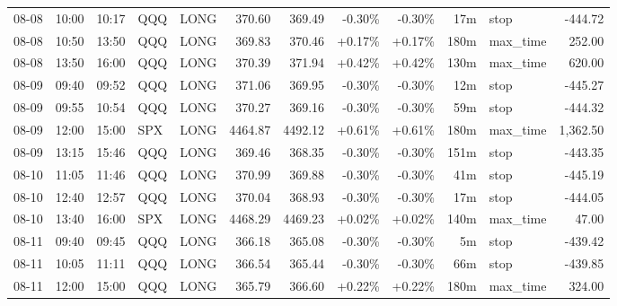 \documentclass[11pt,a4paper]{article}
\begin{document}
\begin{center}
\begin{longtable}{>{\color{txtmain}}l l l l l r r r r r >{\color{txtmain}}l r}
08-08 & 10:00 & 10:17 & QQQ & LONG & 370.60 & 369.49 & \textcolor{lossred}{-0.30\%} & \textcolor{lossred}{-0.30\%} & 17m & stop & \textcolor{lossred}{-444.72} \\
08-08 & 10:50 & 13:50 & QQQ & LONG & 369.83 & 370.46 & \textcolor{wingreen}{+0.17\%} & \textcolor{wingreen}{+0.17\%} & 180m & max\_time & \textcolor{wingreen}{252.00} \\
08-08 & 13:50 & 16:00 & QQQ & LONG & 370.39 & 371.94 & \textcolor{wingreen}{+0.42\%} & \textcolor{wingreen}{+0.42\%} & 130m & max\_time & \textcolor{wingreen}{620.00} \\
08-09 & 09:40 & 09:52 & QQQ & LONG & 371.06 & 369.95 & \textcolor{lossred}{-0.30\%} & \textcolor{lossred}{-0.30\%} & 12m & stop & \textcolor{lossred}{-445.27} \\
08-09 & 09:55 & 10:54 & QQQ & LONG & 370.27 & 369.16 & \textcolor{lossred}{-0.30\%} & \textcolor{lossred}{-0.30\%} & 59m & stop & \textcolor{lossred}{-444.32} \\
08-09 & 12:00 & 15:00 & SPX & LONG & 4464.87 & 4492.12 & \textcolor{wingreen}{+0.61\%} & \textcolor{wingreen}{+0.61\%} & 180m & max\_time & \textcolor{wingreen}{1,362.50} \\
08-09 & 13:15 & 15:46 & QQQ & LONG & 369.46 & 368.35 & \textcolor{lossred}{-0.30\%} & \textcolor{lossred}{-0.30\%} & 151m & stop & \textcolor{lossred}{-443.35} \\
08-10 & 11:05 & 11:46 & QQQ & LONG & 370.99 & 369.88 & \textcolor{lossred}{-0.30\%} & \textcolor{lossred}{-0.30\%} & 41m & stop & \textcolor{lossred}{-445.19} \\
08-10 & 12:40 & 12:57 & QQQ & LONG & 370.04 & 368.93 & \textcolor{lossred}{-0.30\%} & \textcolor{lossred}{-0.30\%} & 17m & stop & \textcolor{lossred}{-444.05} \\
08-10 & 13:40 & 16:00 & SPX & LONG & 4468.29 & 4469.23 & \textcolor{wingreen}{+0.02\%} & \textcolor{wingreen}{+0.02\%} & 140m & max\_time & \textcolor{wingreen}{47.00} \\
08-11 & 09:40 & 09:45 & QQQ & LONG & 366.18 & 365.08 & \textcolor{lossred}{-0.30\%} & \textcolor{lossred}{-0.30\%} & 5m & stop & \textcolor{lossred}{-439.42} \\
08-11 & 10:05 & 11:11 & QQQ & LONG & 366.54 & 365.44 & \textcolor{lossred}{-0.30\%} & \textcolor{lossred}{-0.30\%} & 66m & stop & \textcolor{lossred}{-439.85} \\
08-11 & 12:00 & 15:00 & QQQ & LONG & 365.79 & 366.60 & \textcolor{wingreen}{+0.22\%} & \textcolor{wingreen}{+0.22\%} & 180m & max\_time & \textcolor{wingreen}{324.00} \\

\end{longtable}
\end{center}
\end{document}
